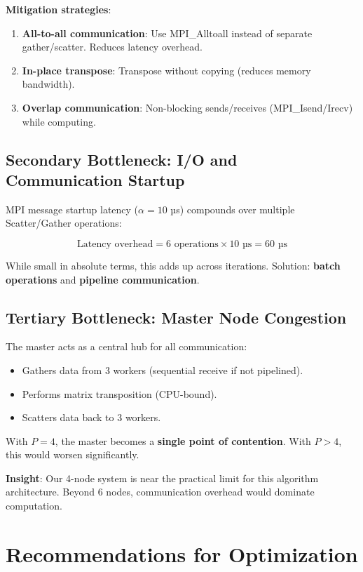 \documentclass[11pt,a4paper]{article}
\theoremstyle{definition}
\begin{document}
\textbf{Mitigation strategies}:
\begin{enumerate}
    \item \textbf{All-to-all communication}: Use MPI\_Alltoall instead of separate gather/scatter. Reduces latency overhead.
    \item \textbf{In-place transpose}: Transpose without copying (reduces memory bandwidth).
    \item \textbf{Overlap communication}: Non-blocking sends/receives (MPI\_Isend/Irecv) while computing.
\end{enumerate}

\subsection{Secondary Bottleneck: I/O and Communication Startup}

MPI message startup latency ($\alpha = 10$ µs) compounds over multiple Scatter/Gather operations:

\[
\text{Latency overhead} = 6 \text{ operations} \times 10 \text{ µs} = 60 \text{ µs}
\]

While small in absolute terms, this adds up across iterations. Solution: \textbf{batch operations} and \textbf{pipeline communication}.

\subsection{Tertiary Bottleneck: Master Node Congestion}

The master acts as a central hub for all communication:
\begin{itemize}
    \item Gathers data from 3 workers (sequential receive if not pipelined).
    \item Performs matrix transposition (CPU-bound).
    \item Scatters data back to 3 workers.
\end{itemize}

With $P=4$, the master becomes a \textbf{single point of contention}. With $P > 4$, this would worsen significantly.

\textbf{Insight}: Our 4-node system is near the practical limit for this algorithm architecture. Beyond 6 nodes, communication overhead would dominate computation.

\section{Recommendations for Optimization}
\end{document}
